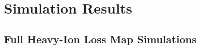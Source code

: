 \section{Simulation Results} \label{chap:STIERresults}
\subsection{Full Heavy-Ion Loss Map Simulations} \label{chap:STIER:full}






